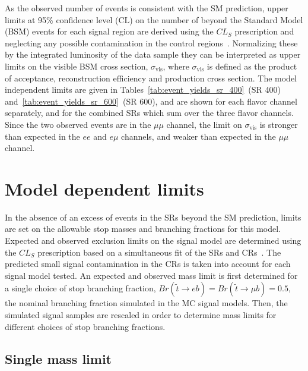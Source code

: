 As the observed number of events is consistent with the SM
prediction, upper limits at 95\% confidence level (CL) on the number of
beyond the Standard Model (BSM) events for each signal region are derived
using the $CL_S$ prescription and neglecting any possible contamination in the
control regions~\cite{Baak:2014wma}.
Normalizing these by the integrated luminosity of the data sample they can be
interpreted as upper limits on the visible BSM cross section,
$\sigma_\mathrm{vis}$, where $\sigma_\mathrm{vis}$ is defined as the product of
acceptance, reconstruction efficiency and production cross section.
The model independent limits are given in
Tables~\ref{tab:event_yields_sr_400}~(SR 400)
and~\ref{tab:event_yields_sr_600}~(SR 600), and are shown for each flavor
channel separately, and for the combined SRs which sum over the three flavor
channels.
Since the two observed events are in the $\mu\mu$ channel, the limit on
$\sigma_\mathrm{vis}$ is stronger than expected in the $ee$ and $e\mu$
channels, and weaker than expected in the $\mu\mu$ channel.

\FloatBarrier
\section{Model dependent limits}
\label{sec:model_dependent_limits}

In the absence of an excess of events in the SRs beyond the SM prediction,
limits are set on the allowable stop masses and branching fractions for this
model.
Expected and observed exclusion limits on the signal model are determined using
the $CL_S$ prescription based on a simultaneous fit of the SRs and
CRs~\cite{Baak:2014wma}.
The predicted small signal contamination in the CRs is taken into account for
each signal model tested.
An expected and observed mass limit is first determined for a single choice of
stop branching fraction, $Br(\tilde{t} \to eb) = Br(\tilde{t} \to \mu b) = 0.5$,
the nominal branching fraction simulated in the MC signal models.
Then, the simulated signal samples are rescaled in order to determine mass
limits for different choices of stop branching fractions.

\FloatBarrier
\subsection{Single mass limit}
\label{sec:single_mass_limit}

